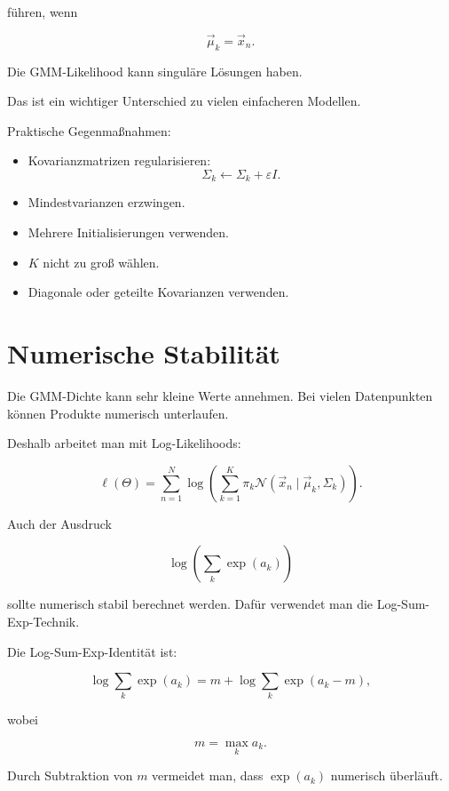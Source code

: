 führen, wenn

\[
    \vec{\mu}_k=\vec{x}_n.
\]

\begin{examtipbox}
Die GMM-Likelihood kann singuläre Lösungen haben.

Das ist ein wichtiger Unterschied zu vielen einfacheren Modellen.
\end{examtipbox}

Praktische Gegenmaßnahmen:

\begin{itemize}
    \item Kovarianzmatrizen regularisieren:
    \[
        \Sigma_k
        \leftarrow
        \Sigma_k+\varepsilon I.
    \]
    \item Mindestvarianzen erzwingen.
    \item Mehrere Initialisierungen verwenden.
    \item \(K\) nicht zu groß wählen.
    \item Diagonale oder geteilte Kovarianzen verwenden.
\end{itemize}

\section{Numerische Stabilität}

Die GMM-Dichte kann sehr kleine Werte annehmen.
Bei vielen Datenpunkten können Produkte numerisch unterlaufen.

Deshalb arbeitet man mit Log-Likelihoods:

\[
    \ell(\Theta)
    =
    \sum_{n=1}^{N}
    \log
    \left(
        \sum_{k=1}^{K}
        \pi_k
        \mathcal{N}(\vec{x}_n\mid\vec{\mu}_k,\Sigma_k)
    \right).
\]

Auch der Ausdruck

\[
    \log
    \left(
        \sum_k
        \exp(a_k)
    \right)
\]

sollte numerisch stabil berechnet werden.
Dafür verwendet man die Log-Sum-Exp-Technik.

\begin{definitionbox}
Die Log-Sum-Exp-Identität ist:

\[
    \log\sum_k\exp(a_k)
    =
    m
    +
    \log
    \sum_k
    \exp(a_k-m),
\]

wobei

\[
    m=\max_k a_k.
\]
\end{definitionbox}

\begin{notebox}
Durch Subtraktion von \(m\) vermeidet man, dass \(\exp(a_k)\) numerisch überläuft.
\end{notebox}


